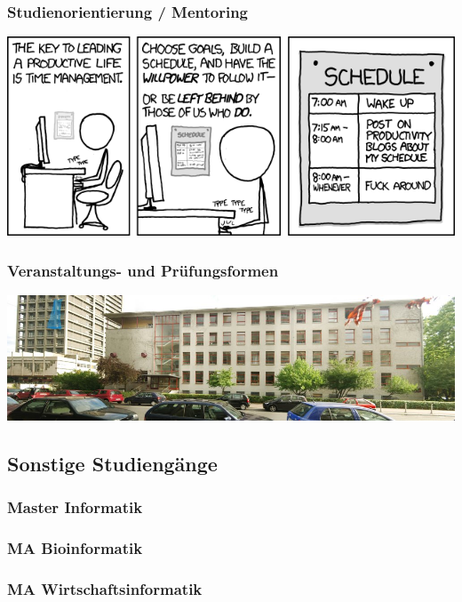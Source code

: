 \documentclass[12pt,a4paper]{scrartcl}
\begin{document}
\subsubsection{Studienorientierung / Mentoring}

\begin{center}
	\includegraphics[scale=0.8]{comics/time_management.png}
\end{center}
\newpage
\subsubsection{Veranstaltungs- und Prüfungsformen}



	\begin{center}
		\includegraphics[scale=1.0]{bilder/rm_pano}
	\end{center}
\subsection{Sonstige Studiengänge}
	\subsubsection{Master Informatik}
	
	\subsubsection{MA Bioinformatik}
	
	\subsubsection{MA Wirtschaftsinformatik}
\newpage
\end{document}
